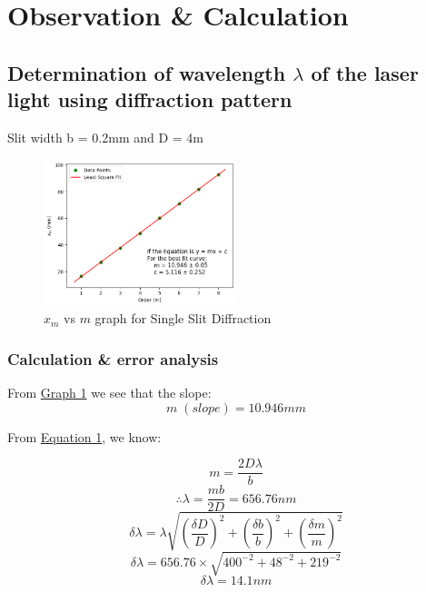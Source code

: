 \section{Observation \& Calculation}
    \subsection{Determination of wavelength $\lambda$ of the laser light using diffraction pattern}

        Slit width b = 0.2mm and D = 4m
        

        \begin{figure}[H]
            \centering
            \includegraphics[width=0.5\textwidth]{images/graph_1.png}
            \caption{$x_m$ vs $m$ graph for Single Slit Diffraction}
            \label{graph:1}
        \end{figure}

        \subsubsection{Calculation \& error analysis}
            From \hyperref[graph:1]{Graph 1} we see that the slope:
            $$m\;(slope) = 10.946 mm$$
            
            
            From \hyperref[eqn:1]{Equation 1}, we know:
            
            $$m = \frac{2D\lambda}{b}$$
            $$\therefore \lambda = \frac{mb}{2D} = 656.76nm$$
            $$\delta\lambda = \lambda\sqrt{\left(\frac{\delta D}{D}\right)^2 + \left(\frac{\delta b}{b}\right)^2 + \left(\frac{\delta m}{m}\right)^2}$$
            $$\delta\lambda = 656.76\times\sqrt{400^{-2}+48^{-2}+219^{-2}}$$
            $$\delta\lambda = 14.1nm$$

            \begin{center}
                \label{ans:1}
            \end{center}

